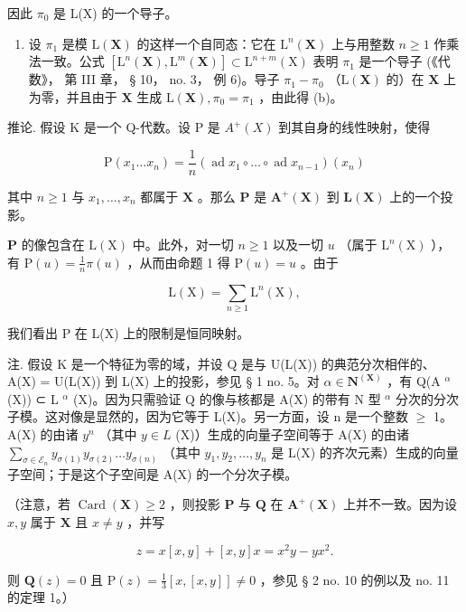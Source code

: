 因此 \(\pi_0\) 是 L(X) 的一个导子。

\begin{enumerate}
\def\labelenumi{(\alph{enumi})}
\setcounter{enumi}{1}
\tightlist
\item
  设 \(\pi_1\) 是模 \(\mathrm{L}(\mathbf{X})\) 的这样一个自同态：它在 \(\mathrm{L}^n (\mathbf{X})\) 上与用整数 \(n\geqslant 1\) 作乘法一致。公式 \([\mathrm{L}^n (\mathbf{X}),\mathrm{L}^m (\mathbf{X})]\subset \mathrm{L}^{n + m}(\mathrm{X})\) 表明 \(\pi_{1}\) 是一个导子 (《代数》， 第 III 章， § 10， no. 3， 例 6)。导子 \(\pi_1 - \pi_0\) （\(\mathrm{L}(\mathbf{X})\) 的）在 \(\mathbf{X}\) 上为零，并且由于 \(\mathbf{X}\) 生成 \(\mathrm{L}(\mathbf{X}),\pi_0 = \pi_1\) ，由此得 (b)。
\end{enumerate}

推论. 假设 K 是一个 Q-代数。设 P 是 \(A^{+}(X)\) 到其自身的线性映射，使得

\[
\mathrm{P} \left(x _ {1} \dots x _ {n}\right) = \frac {1}{n} (\operatorname{ad} x _ {1} \circ \dots \circ \operatorname{ad} x _ {n - 1}) (x _ {n})\tag{6}
\]

其中 \(n \geqslant 1\) 与 \(x_1, \ldots, x_n\) 都属于 \(\mathbf{X}\) 。那么 \(\mathbf{P}\) 是 \(\mathbf{A}^+(\mathbf{X})\) 到 \(\mathbf{L}(\mathbf{X})\) 上的一个投影。

\(\mathbf{P}\) 的像包含在 \(\mathrm{L}(\mathrm{X})\) 中。此外，对一切 \(n \geqslant 1\) 以及一切 \(u\) （属于 \(\mathrm{L}^n (\mathrm{X})\) ），有 \(\mathrm{P}(u) = \frac{1}{n}\pi (u)\) ，从而由命题 1 得 \(\mathrm{P}(u) = u\) 。由于

\[
\mathrm{L} (\mathrm{X}) = \sum_ {n \geqslant 1} \mathrm{L} ^ {n} (\mathrm{X}),
\]

我们看出 P 在 L(X) 上的限制是恒同映射。

注. 假设 K 是一个特征为零的域，并设 Q 是与 U(L(X)) 的典范分次相伴的、A(X) = U(L(X)) 到 L(X) 上的投影，参见 § 1 no. 5。对 \(\alpha \in \mathbf{N}^{(\mathbf{X})}\) ，有 Q(A \(^\alpha\) (X)) ⊂ L \(^\alpha\) (X)。因为只需验证 Q 的像与核都是 A(X) 的带有 N 型 \(^\alpha\) 分次的分次子模。这对像是显然的，因为它等于 L(X)。另一方面，设 n 是一个整数 \(\geqslant\) 1。A(X) 的由诸 \(y^n\) （其中 \(y \in L\) (X)）生成的向量子空间等于 A(X) 的由诸 \(\sum_{\sigma \in \mathcal{E}_n} y_{\sigma(1)} y_{\sigma(2)} \ldots y_{\sigma(n)}\) （其中 \(y_1, y_2, \ldots, y_n\) 是 L(X) 的齐次元素）生成的向量子空间；于是这个子空间是 A(X) 的一个分次子模。

（注意，若 \(\operatorname{Card}(\mathbf{X}) \geqslant 2\) ，则投影 \(\mathbf{P}\) 与 \(\mathbf{Q}\) 在 \(\mathbf{A}^{+}(\mathbf{X})\) 上并不一致。因为设 \(x, y\) 属于 \(\mathbf{X}\) 且 \(x \neq y\) ，并写

\[
z = x [ x, y ] + [ x, y ] x = x ^ {2} y - y x ^ {2}.
\]

则 \(\mathbf{Q}(z) = 0\) 且 \(\mathrm{P}(z) = \frac{1}{3}[x, [x,y]] \neq 0\) ，参见 § 2 no. 10 的例以及 no. 11 的定理 1。）

